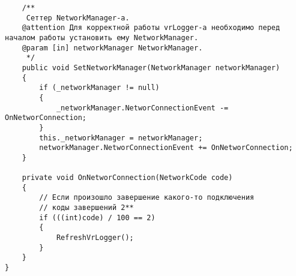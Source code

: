 \begin{verbatim}
    /**
     Сеттер NetworkManager-а. 
    @attention Для корректной работы vrLogger-а необходимо перед началом работы установить ему NetworkManager.
    @param [in] networkManager NetworkManager.
     */
    public void SetNetworkManager(NetworkManager networkManager)
    {
        if (_networkManager != null)
        {
            _networkManager.NetworConnectionEvent -= OnNetworConnection;
        }
        this._networkManager = networkManager;
        networkManager.NetworConnectionEvent += OnNetworConnection;
    }

    private void OnNetworConnection(NetworkCode code)
    {
        // Если произошло завершение какого-то подключения
        // коды завершений 2**
        if (((int)code) / 100 == 2)
        {
            RefreshVrLogger();
        }
    }
}

\end{verbatim}
